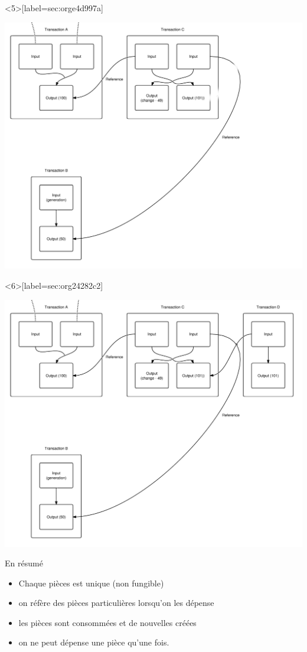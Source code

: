 \documentclass[presentation]{beamer}
\begin{document}
\begin{frame}<5>[label={sec:orge4d997a}]{}
\begin{center}
\includegraphics[width=.9\textwidth]{Images/Transaction5.png}
\end{center}
\end{frame}
\begin{frame}<6>[label={sec:org24282c2}]{}
\begin{center}
\includegraphics[width=.9\textwidth]{Images/Transaction6.png}
\end{center}
\end{frame}



\begin{frame}[label={sec:org2e9e0eb}]{En résumé}
\begin{itemize}
\item Chaque pièces est unique (non fungible)
\item on réfère des pièces particulières lorsqu'on les dépense
\item les pièces sont consommées et de nouvelles créées
\item on ne peut dépense une pièce qu'une fois.
\end{itemize}
\end{frame}
\end{document}
